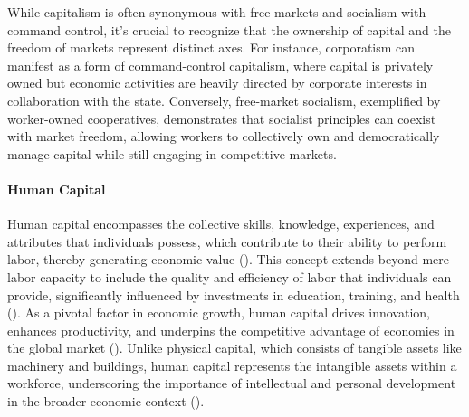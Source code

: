 \documentclass{article}
\begin{document}
While capitalism is often synonymous with free markets and socialism with command control, it's crucial to recognize that the ownership of capital and the freedom of markets represent distinct axes. For instance, corporatism can manifest as a form of command-control capitalism, where capital is privately owned but economic activities are heavily directed by corporate interests in collaboration with the state. Conversely, free-market socialism, exemplified by worker-owned cooperatives, demonstrates that socialist principles can coexist with market freedom, allowing workers to collectively own and democratically manage capital while still engaging in competitive markets.

\paragraph{Human Capital}
Human capital encompasses the collective skills, knowledge, experiences, and attributes that individuals possess, which contribute to their ability to perform labor, thereby generating economic value (\cite{becker}). This concept extends beyond mere labor capacity to include the quality and efficiency of labor that individuals can provide, significantly influenced by investments in education, training, and health (\cite{solow}). As a pivotal factor in economic growth, human capital drives innovation, enhances productivity, and underpins the competitive advantage of economies in the global market (\cite{smith}). Unlike physical capital, which consists of tangible assets like machinery and buildings, human capital represents the intangible assets within a workforce, underscoring the importance of intellectual and personal development in the broader economic context (\cite{modernResearch}).
\end{document}
